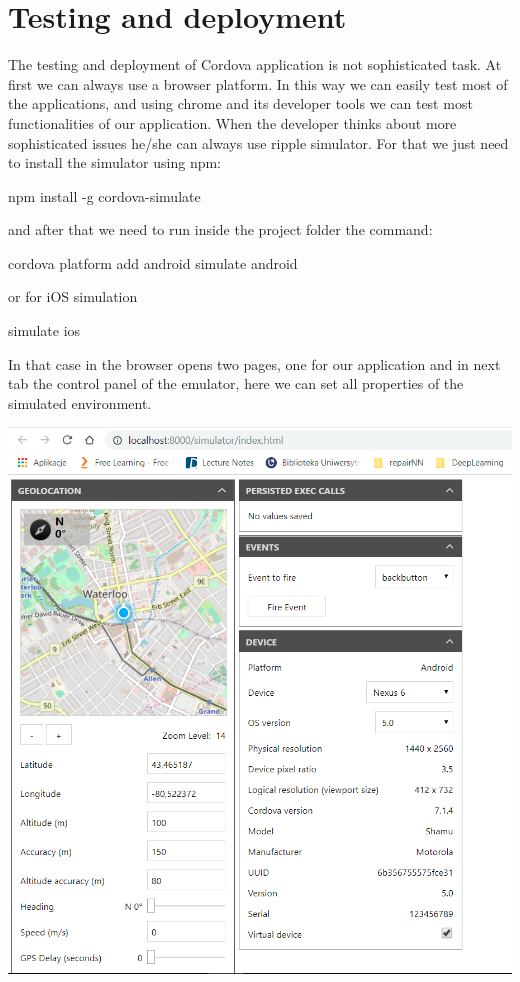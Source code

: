 \chapter{Testing and deployment}

The testing and deployment of Cordova application is not sophisticated task. At first we can always use a browser platform. In this way we can easily test most of the applications, and using chrome and its developer tools we can test most functionalities of our application. When the developer thinks about more sophisticated issues he/she can always use ripple simulator. For that we just need to install the simulator using npm:

\begin{shell}
npm install -g cordova-simulate
\end{shell}

and after that we need to run inside the project folder the command:

\begin{shell}
cordova platform add android
simulate android
\end{shell}

or for iOS simulation
  
\begin{shell}
simulate ios
\end{shell}

In that case in the browser opens two pages, one for our application and in next tab the control panel of the emulator, here we can set all properties of the simulated environment.

\includegraphics[width=\textwidth]{chapters/img/simulator_screen.png}

